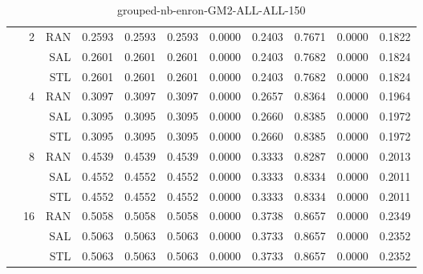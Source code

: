 \begin{center}
\begin{table}[htbp]
\begin{center}
\begin{tabular}{ | r | r | r | r | r | r | r | r | r | r | r |}
 & \multirow{3}{*}{2} & RAN & 0.2593 & 0.2593 & 0.2593 & 0.0000 & 0.2403 & 0.7671 & 0.0000 & 0.1822\\ \cline{3-11}
 &   & SAL & 0.2601 & 0.2601 & 0.2601 & 0.0000 & 0.2403 & 0.7682 & 0.0000 & 0.1824\\ \cline{3-11}
 &   & STL & 0.2601 & 0.2601 & 0.2601 & 0.0000 & 0.2403 & 0.7682 & 0.0000 & 0.1824\\ \cline{2-11}
 & \multirow{3}{*}{4} & RAN & 0.3097 & 0.3097 & 0.3097 & 0.0000 & 0.2657 & 0.8364 & 0.0000 & 0.1964\\ \cline{3-11}
 &   & SAL & 0.3095 & 0.3095 & 0.3095 & 0.0000 & 0.2660 & 0.8385 & 0.0000 & 0.1972\\ \cline{3-11}
 &   & STL & 0.3095 & 0.3095 & 0.3095 & 0.0000 & 0.2660 & 0.8385 & 0.0000 & 0.1972\\ \cline{2-11}
 & \multirow{3}{*}{8} & RAN & 0.4539 & 0.4539 & 0.4539 & 0.0000 & 0.3333 & 0.8287 & 0.0000 & 0.2013\\ \cline{3-11}
 &   & SAL & 0.4552 & 0.4552 & 0.4552 & 0.0000 & 0.3333 & 0.8334 & 0.0000 & 0.2011\\ \cline{3-11}
 &   & STL & 0.4552 & 0.4552 & 0.4552 & 0.0000 & 0.3333 & 0.8334 & 0.0000 & 0.2011\\ \cline{2-11}
 & \multirow{3}{*}{16} & RAN & 0.5058 & 0.5058 & 0.5058 & 0.0000 & 0.3738 & 0.8657 & 0.0000 & 0.2349\\ \cline{3-11}
 &   & SAL & 0.5063 & 0.5063 & 0.5063 & 0.0000 & 0.3733 & 0.8657 & 0.0000 & 0.2352\\ \cline{3-11}
 &   & STL & 0.5063 & 0.5063 & 0.5063 & 0.0000 & 0.3733 & 0.8657 & 0.0000 & 0.2352\\ \cline{2-11}
\hline
\end{tabular}
\caption{grouped-nb-enron-GM2-ALL-ALL-150}
\end{center}
 \end{table}
\end{center}

